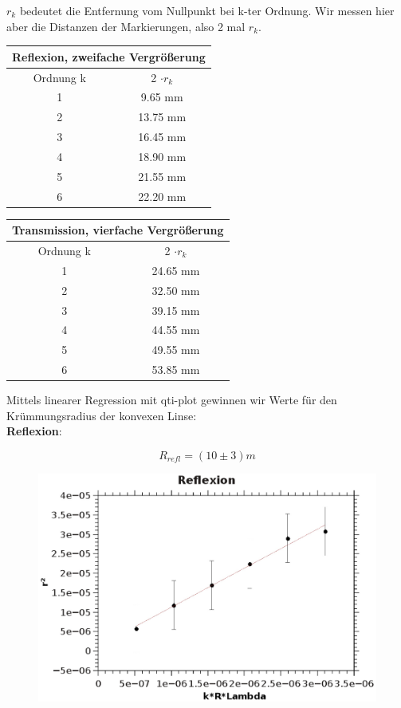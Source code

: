 \documentclass{article}
\begin{document}
$r_k$ bedeutet die Entfernung vom Nullpunkt bei k-ter Ordnung. Wir messen hier aber die Distanzen der Markierungen, also 2 mal $r_k$.\\
\begin{center}
\begin{tabular}{|c|c|}
\hline
\multicolumn{2}{|c|}{Reflexion, zweifache Vergrößerung} \\
\hline
Ordnung k & 2 $\cdot r_k$ \\
\hline
\hline
1 & 9.65 mm \\
2 & 13.75 mm  \\
3 & 16.45 mm\\
4 & 18.90 mm\\
5 & 21.55 mm\\
6 & 22.20 mm\\
\hline
\end{tabular}
\begin{tabular}{|c|c|}
\hline
\multicolumn{2}{|c|}{Transmission, vierfache Vergrößerung} \\
\hline
Ordnung k & 2 $\cdot r_k$ \\
\hline
\hline
1 & 24.65 mm \\
2 & 32.50 mm  \\
3 & 39.15 mm\\
4 & 44.55 mm\\
5 & 49.55 mm\\
6 & 53.85 mm\\
\hline
\end{tabular}
\end{center}
Mittels linearer Regression mit qti-plot gewinnen wir Werte für den Krümmungsradius der konvexen Linse:\\

\textbf{Reflexion}:

$$\boxed{ R_{refl}=(10 \pm 3)m }$$
\begin{center}
\begin{figure}
\includegraphics[scale=0.7]{refl.eps}
\end{figure}
\end{center}
\end{document}
